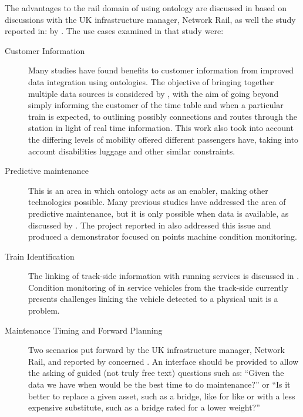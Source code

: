 The advantages to the rail domain of using ontology are discussed in \citet{Morris} based on discussions with the UK infrastructure manager, Network Rail, as well the study reported in:  by \citet{Roberts2011}. The use cases examined in that study were:
\begin{description}
    \item[Customer Information] Many studies have found benefits to customer information from improved data integration using ontologies. The objective of bringing together multiple data sources is considered by \citet{Verstichel2014}, with the aim of going beyond simply informing the customer of the time table and when a particular train is expected, to outlining possibly connections and routes through the station in light of real time information. This work also took into account the differing levels of mobility offered different passengers have, taking into account disabilities luggage and other similar constraints.
    \item[Predictive maintenance]
    This is an area in which ontology acts as an enabler, making other technologies possible. Many previous studies have addressed the area of predictive maintenance, but it is only possible when data is available, as discussed by \citet{Umiliacchi2011}. The project reported in \citet{Tutcher2015a} also addressed this issue and produced a demonstrator focused on points machine condition monitoring. 
    \item[Train Identification]
    The linking of track-side information with running services is discussed in \citep{Morris}. Condition monitoring of in service vehicles from the track-side currently presents challenges linking the vehicle detected to a physical unit is a problem. 
    \item[Maintenance Timing and Forward Planning]
    Two scenarios put forward by the UK infrastructure manager, Network Rail, and reported by \citet{Morris} concerned . An interface should be provided to allow the asking of guided (not truly free text) questions such as: ``Given the data we have when would be the best time to do maintenance?'' or ``Is it better to replace a given asset, such as a bridge, like for like or with a less expensive substitute, such as a bridge rated for a lower weight?''    
\end{description}
    
